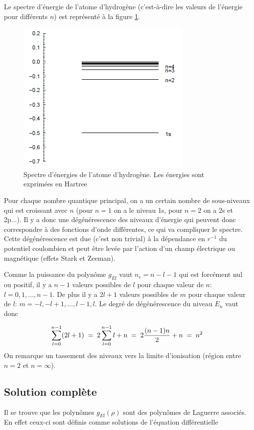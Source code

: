 Le spectre d'énergie de l'atome d'hydrogène (c'est-à-dire les valeurs de l'énergie pour différents $n$) est représenté à la figure \ref{fig:spectreH}.
\begin{figure}[htp]
    \centering
    \includegraphics{Images2/spectreH.PNG}
    \caption{Spectre d'énergies de l'atome d'hydrogène. Les énergies sont exprimées en Hartree}
    \label{fig:spectreH}
\end{figure}
Pour chaque nombre quantique principal, on a un certain nombre de sous-niveaux qui est croissant avec $n$ (pour $n=1$ on a le niveau 1s, pour $n=2$ on a 2s et 2p...). Il y a donc une dégénérescence des niveaux d'énergie qui peuvent donc correspondre à des fonctions d'onde différentes, ce qui va compliquer le spectre. Cette dégénérescence est due (c'est non trivial) à la dépendance en $r^{-1}$ du potentiel coulombien et peut être levée par l'action d'un champ électrique ou magnétique (effets Stark et Zeeman).

Comme la puissance du polynôme $g_{El}$ vaut $n_r=n-l-1$ qui est forcément nul ou positif, il y a $n-1$ valeurs possibles de $l$ pour chaque valeur de $n$: $l=0, 1, ..., n-1$. De plus il y a $2l+1$ valeurs possibles de $m$ pour chaque valeur de $l$: $m=-l, -l+1, ..., l-1, l$. Le degré de dégénérescence du niveau $E_n$ vaut donc

\[
    \sum_{l=0}^{n-1} (2l+1)\; = \; 2\sum_{l=0}^{n-1} l + n \; = \;  2 \dfrac{(n-1)n}{2} + n \; = \;  n^2
\]
On remarque un tassement des niveaux vers la limite d'ionisation (région entre $n=2$ et $n=\infty$).

\subsection{Solution complète}
Il se trouve que les polynômes $g_{El}(\rho)$ sont des polynômes de Laguerre associés. En effet ceux-ci sont définis comme solutions de l'équation différentielle

